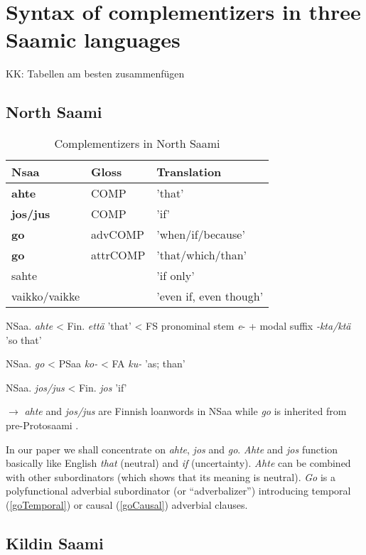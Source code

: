 \documentclass[a4,12pt]{scrartcl}
\begin{document}
\section{Syntax of complementizers in three Saamic languages}\label{syntax}
KK: Tabellen am besten zusammenfügen

\subsection{North Saami}
\begin{table}[!ht]
\begin{tabular}{l | l l}
\hline
\hline
Nsaa & Gloss & Translation\\
\hline
{\bf ahte} & {\sc COMP} & 'that'\\
{\bf jos/jus} & {\sc COMP} & 'if'\\
{\bf go} & {\sc advCOMP} & 'when/if/because'\\
{\bf go} & {\sc attrCOMP} & 'that/which/than'\\
sahte & & 'if only'\\
vaikko/vaikke & & 'even if, even though'\\
\hline
\hline
\end{tabular}
\label{KompNSaami}
\caption{Complementizers in North Saami}
\end{table}

NSaa. {\it ahte} < Fin. {\it että} 'that' < FS pronominal stem {\it *e}- + modal suffix {\it -kta/ktä} 'so that'
 
NSaa. {\it go} < PSaa {\it *ko-} < FA {\it *ku-} 'as; than'

NSaa. {\it jos/jus} < Fin. {\it jos} 'if'

$\rightarrow$ {\it ahte} and {\it jos/jus} are Finnish loanwords in NSaa while {\it go} is inherited from pre-Protosaami \cite[226;245;251]{sammallahti1998b}.

In our paper we shall concentrate on {\it ahte}, {\it jos} and {\it go}. {\it Ahte} and  {\it jos}  function basically like English {\it that} (neutral) and {\it if} (uncertainty). {\it Ahte} can be combined with other subordinators (which shows that its meaning is neutral).  
{\it Go} is a polyfunctional adverbial subordinator (or “adverbalizer”) introducing temporal (\ref{goTemporal}) or causal (\ref{goCausal}) adverbial clauses.


\subsection{Kildin Saami}
\end{document}
